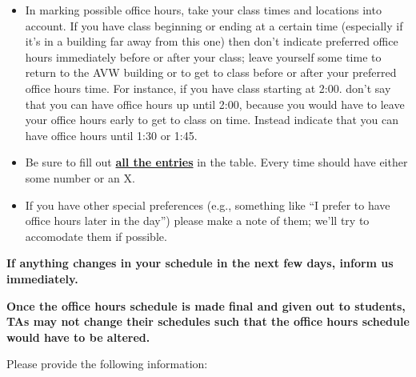 \documentclass[letterpaper,11pt]{article}
\renewcommand{\arraystretch}{2}
\begin{document}
\begin{itemize}
    \item In marking possible office hours, take your class times and
          locations into account.  If you have class beginning or ending at
          a certain time (especially if it's in a building far away from
          this one) then don't indicate preferred office hours immediately
          before or after your class; leave yourself some time to return to
          the AVW building or to get to class before or after your preferred
          office hours time.  For instance, if you have class starting at
          2:00.  don't say that you can have office hours up until 2:00,
          because you would have to leave your office hours early to get to
          class on time.  Instead indicate that you can have office hours
          until 1:30 or 1:45.

    \item Be sure to fill out \textbf{\underline{all the entries}} in the
          table.  Every time should have either some number or an X.

    \item If you have other special preferences (e.g., something like ``I
          prefer to have office hours later in the day'') please make a note
          of them; we'll try to accomodate them if possible.

  \end{itemize}

  \noindent
  \textbf{If anything changes in your schedule in the next few days, inform
  us immediately.}

  \medskip

  \noindent
  \textbf{Once the office hours schedule is made final and given out to
  students, TAs may not change their schedules such that the office hours
  schedule would have to be altered.}

  \bigskip\medskip

  \renewcommand{\arraystretch}{1.5}

  \begin{center}

    {\Large Please provide the following information:}

  \end{center}

  \vspace{-2mm}
\end{document}

